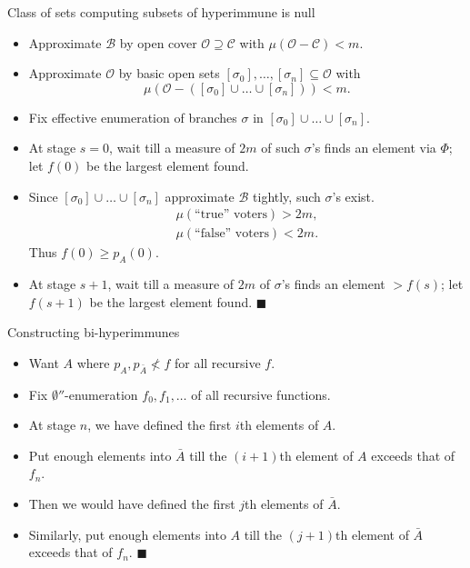 \begin{frame}{Class of sets computing subsets of hyperimmune is null}
  \begin{itemize}
    \item Approximate $\mathcal{B}$ by open cover
      $\mathcal{O}\supseteq\mathcal{C}$ with
      $\mu(\mathcal{O}-\mathcal{C})<m$.
    \item Approximate $\mathcal{O}$ by basic open sets
      $[\sigma_0],\ldots,[\sigma_n] \subseteq\mathcal{O}$ with
      \[\mu(\mathcal{O}-([\sigma_0]\cup\ldots\cup[\sigma_n])) <m.\]
    \item Fix effective enumeration of branches $\sigma$ in
      $[\sigma_0]\cup\ldots\cup[\sigma_n]$.
    \item At stage $s=0$, wait till a measure of $2m$ of such $\sigma$'s
      finds an element via $\Phi$; let $f(0)$ be the largest element found.
    \item Since $[\sigma_0]\cup\ldots\cup[\sigma_n]$ approximate $\mathcal{B}$
      tightly, such $\sigma$'s exist.
      \begin{align*}
        \mu(\text{``true'' voters})>2m,\\
        \mu(\text{``false'' voters})<2m.
      \end{align*}
      Thus $f(0)\geq p_A(0)$.
    \item At stage $s+1$, wait till a measure of $2m$ of $\sigma$'s
      finds an element $>f(s)$; let $f(s+1)$ be the largest
      element found. $\blacksquare$
  \end{itemize}
\end{frame}

\begin{frame}{Constructing bi-hyperimmunes}
  \begin{itemize}
    \item Want $A$ where $p_A,p_{\bar{A}}\not<f$ for all recursive $f$.
    \item Fix $\emptyset''$-enumeration $f_0,f_1,\ldots$ of all recursive
      functions.
    \item At stage $n$, we have defined the first $i$th elements of $A$.
    \item Put enough elements into $\bar{A}$ till the $(i+1)$th element
      of $A$ exceeds that of $f_n$.
    \item Then we would have defined the first $j$th elements of $\bar{A}$.
    \item Similarly, put enough elements into $A$ till the $(j+1)$th
      element of $\bar{A}$ exceeds that of $f_n$. $\blacksquare$
  \end{itemize}
\end{frame}
